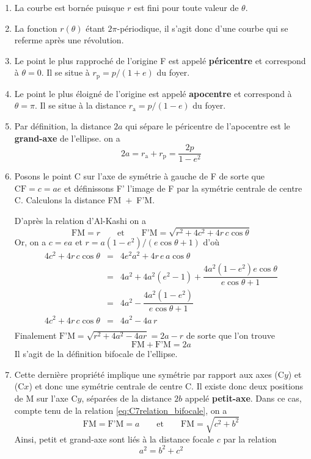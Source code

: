 \begin{enumerate}
	\item La courbe est bornée puisque $r$ est fini pour toute valeur de $\theta$. 
	\item La fonction $r(\theta)$ étant $2\pi$-périodique, il s'agit donc d'une courbe qui se referme après une révolution.
	\item Le point le plus rapproché de l'origine F est appelé \textbf{péricentre} et correspond à $\theta=0$. Il se situe à $r_{\textrm{p}}=p/(1+e)$ du foyer.
	\item Le point le plus éloigné de l'origine est appelé \textbf{apocentre} et correspond à $\theta=\pi$. Il se situe à la distance $r_{\textrm{a}}=p/(1-e)$ du foyer.
	\item Par définition, la distance $2a$ qui sépare le péricentre de l'apocentre est le \textbf{grand-axe} de l'ellipse. on a 
	\[2a=r_{\textrm{a}}+r_{\textrm{p}}=\frac{2p}{1-e^2}\]
	\item Posons le point C sur l'axe de symétrie à gauche de F de sorte que $\textrm{CF}=c=ae$ et définissons F' l'image de F par la symétrie centrale de centre C. Calculons la distance FM~$+$~F'M. 
	
	D'après la relation d'Al-Kashi on a 
	\[
	\textrm{FM}=r
	\qquad\text{et}\qquad
	\textrm{F'M}=\sqrt{r^2+4c^2+4r\,c\cos\theta}
	\]
	Or, on a  $c=ea$ et $r=a(1-e^2)/(e\cos\theta+1)$ d'où
	\[
	\begin{array}{rcl}
	4c^2+4r\,c\cos\theta	&=&	4e^2a^2+4r\,e\,a\cos\theta\\
							&=& 4a^2+4a^2(e^2-1)+\dfrac{4a^2(1-e^2)e\cos\theta}{e\cos\theta+1}\\
							&=& 4a^2-\dfrac{4a^2(1-e^2)}{e\cos\theta+1}\\	
	4c^2+4r\,c\cos\theta	&=&	4a^2-4a\,r\\								
	\end{array}
	\]
	Finalement $\textrm{F'M}=\sqrt{r^2+4a^2-4ar}=2a-r$ de sorte que l'on trouve
	\begin{equation}
	\boxed{\textrm{FM}+\textrm{F'M}=2a}
	\label{eq:C7relation_bifocale}
	\end{equation}
	Il s'agit de la définition bifocale de l'ellipse. 
	\item Cette dernière propriété implique une symétrie par rapport aux axes (C$y$) et (C$x$)  et donc une symétrie centrale de centre C. Il existe donc deux positions de M sur l'axe C$y$, séparées de la distance $2b$ appelé \textbf{petit-axe}.  Dans ce cas, compte tenu de la relation \eqref{eq:C7relation_bifocale}, on a 
	\[
	\textrm{FM}=\textrm{F'M}=a
	\qquad\text{et}\qquad
	\textrm{FM}=\sqrt{c^2+b^2}
	\]
	Ainsi, petit et grand-axe sont liés à la distance focale $c$ par la relation
	\begin{equation}
	\boxed{a^2=b^{2}+c^{2}}
	\label{eq:C7relation_entre_a_b_et_c}
	\end{equation}
\end{enumerate}
	

